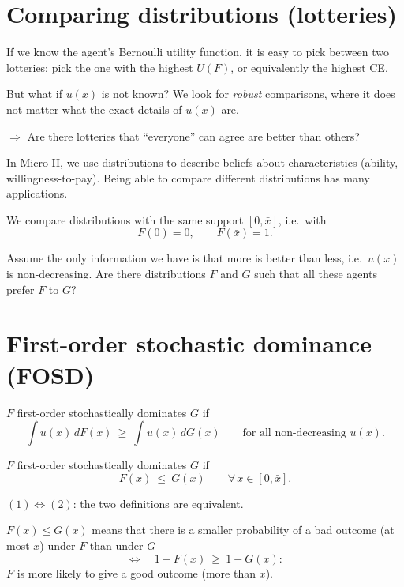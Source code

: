 \documentclass[11pt]{article}
\begin{document}
\section{Comparing distributions (lotteries)}

If we know the agent's Bernoulli utility function, it is easy to pick between two
lotteries: pick the one with the highest $U(F)$, or equivalently the highest CE.

But what if $u(x)$ is not known? We look for \emph{robust} comparisons, where it does
not matter what the exact details of $u(x)$ are.

$\Rightarrow$ Are there lotteries that ``everyone'' can agree are better than others?

 In Micro II, we use distributions to describe beliefs about
characteristics (ability, willingness-to-pay). Being able to compare different
distributions has many applications.

We compare distributions with the same support $[0,\bar x]$, i.e.\ with
\[ F(0)=0, \qquad F(\bar x)=1. \]

 Assume the only information we have is that more is better
than less, i.e.\ $u(x)$ is non-decreasing. Are there distributions $F$ and $G$ such
that all these agents prefer $F$ to $G$?


\section{First-order stochastic dominance (FOSD)}

$F$ first-order stochastically dominates $G$ if
\[ \int u(x)\,dF(x)\ \ge\ \int u(x)\,dG(x) \qquad\text{for all non-decreasing } u(x).
   \tag{1} \]

$F$ first-order stochastically dominates $G$ if
\[ F(x)\ \le\ G(x) \qquad \forall\, x\in[0,\bar x]. \tag{2} \]

$(1)\Longleftrightarrow(2)$: the two definitions are equivalent.

 $F(x)\le G(x)$ means that there is a smaller
probability of a bad outcome (at most $x$) under $F$ than under $G$
\[ \Longleftrightarrow\quad 1-F(x)\ \ge\ 1-G(x): \]
$F$ is more likely to give a good outcome (more than $x$).
\end{document}
